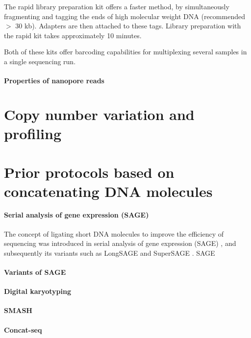 The rapid library preparation kit offers a faster method, by
simultaneously fragmenting and tagging the ends of high molecular weight
DNA (recommended $>$ 30 kb). Adapters are then attached to these tags.
Library preparation with the rapid kit takes approximately 10 minutes.

Both of these kits offer barcoding capabilities for multiplexing several
samples in a single sequencing run.






\paragraph{Properties of nanopore reads}



\section{Copy number variation and profiling}


\section{Prior protocols based on concatenating DNA molecules}
\paragraph{Serial analysis of gene expression (SAGE)}
The concept of ligating short DNA molecules to improve the efficiency
of sequencing was introduced in serial analysis of gene expression
(SAGE) \citep{}, and subsequently its variants such as LongSAGE and
SuperSAGE \citep{}. SAGE

\paragraph{Variants of SAGE}

\paragraph{Digital karyotyping}

\paragraph{SMASH}

\paragraph{Concat-seq}

